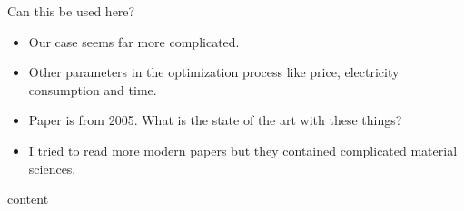 \documentclass{beamer}
\begin{document}
	\begin{frame}{Can this be used here?}
		\begin{itemize}
			\pause
			\item Our case seems far more complicated.
			\pause
			\item Other parameters in the optimization process like price, electricity consumption and time.
			\pause
			\item Paper is from 2005. What is the state of the art with these things?
			\pause
			\item I tried to read more modern papers but they contained complicated material sciences.
		\end{itemize}
	\end{frame}
	
	\begin{frame}{}
		content
	\end{frame}
	
	\begin{frame}
		\printbibliography
	\end{frame} 
\end{document}
